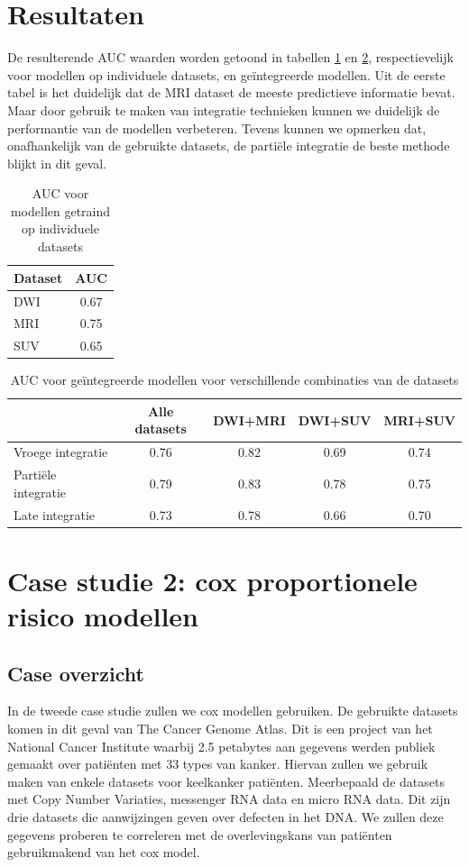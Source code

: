 \section{Resultaten}
De resulterende AUC waarden worden getoond in tabellen \ref{tab:D:evaluation-auc-individual} en \ref{tab:D:evaluation-auc-integrated}, respectievelijk voor modellen op individuele datasets, en ge\"integreerde modellen.
Uit de eerste tabel is het duidelijk dat de MRI dataset de meeste predictieve informatie bevat. Maar door gebruik te maken van integratie technieken kunnen we duidelijk de performantie van de modellen verbeteren. Tevens kunnen we opmerken dat, onafhankelijk van de gebruikte datasets, de parti\"ele integratie de beste methode blijkt in dit geval.
\begin{table}
	\centering
	\begin{tabular}{lc}
		\toprule
		Dataset & AUC \\
		\midrule
		DWI & 0.67 \\
		MRI & 0.75 \\
		SUV & 0.65 \\
		\bottomrule
	\end{tabular}
	\caption{AUC voor modellen getraind op individuele datasets}
	\label{tab:D:evaluation-auc-individual}
\end{table}
\begin{table}
	\centering
	\begin{tabular}{lcccc}
		\toprule
		& Alle datasets & DWI+MRI & DWI+SUV & MRI+SUV \\
		\midrule
		Vroege integratie & 0.76 & 0.82 & 0.69 & 0.74 \\
		Parti\"ele integratie & 0.79 & 0.83 & 0.78 & 0.75 \\
		Late integratie & 0.73 & 0.78 & 0.66 & 0.70 \\
		\bottomrule
	\end{tabular}
	\caption{AUC voor ge\"integreerde modellen voor verschillende combinaties van de datasets}
	\label{tab:D:evaluation-auc-integrated}
\end{table}
\section{Case studie 2: cox proportionele risico modellen}
\subsection{Case overzicht}
In de tweede case studie zullen we cox modellen gebruiken. De gebruikte datasets komen in dit geval van The Cancer Genome Atlas. Dit is een project van het National Cancer Institute waarbij 2.5 petabytes aan gegevens werden publiek gemaakt over pati\"enten met 33 types van kanker. Hiervan zullen we gebruik maken van enkele datasets voor keelkanker pati\"enten. Meerbepaald de datasets met Copy Number Variaties, messenger RNA data en micro RNA data. Dit zijn drie datasets die aanwijzingen geven over defecten in het DNA. We zullen deze gegevens proberen te correleren met de overlevingskans van pati\"enten gebruikmakend van het cox model.

